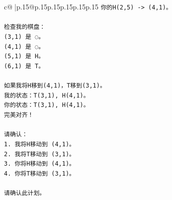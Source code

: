 \documentclass{article}
\begin{document}
{\begin{supertabular}{c@{$\;$}|p{.15\linewidth}@{}p{.15\linewidth}p{.15\linewidth}p{.15\linewidth}p{.15\linewidth}p{.15\linewidth}}
{{{\texttt{你的H(2,5) {-}> (4,1)。} \\
\\ 
\texttt{检查我的棋盘：} \\
\texttt{(3,1) 是 ◌。} \\
\texttt{(4,1) 是 ◌。} \\
\texttt{(5,1) 是 H。} \\
\texttt{(6,1) 是 T。} \\
\\ 
\texttt{如果我将H移到(4,1)，T移到(3,1)。} \\
\texttt{我的状态：T(3,1), H(4,1)。} \\
\texttt{你的状态：T(3,1), H(4,1)。} \\
\texttt{完美对齐！} \\
\\ 
\texttt{请确认：} \\
\texttt{1. 我将H移动到 (4,1)。} \\
\texttt{2. 我将T移动到 (3,1)。} \\
\texttt{3. 你将H移动到 (4,1)。} \\
\texttt{4. 你将T移动到 (3,1)。} \\
\\ 
\texttt{请确认此计划。} \\
            }
        }
    }
     \\ \\


\end{supertabular}}
\end{document}
